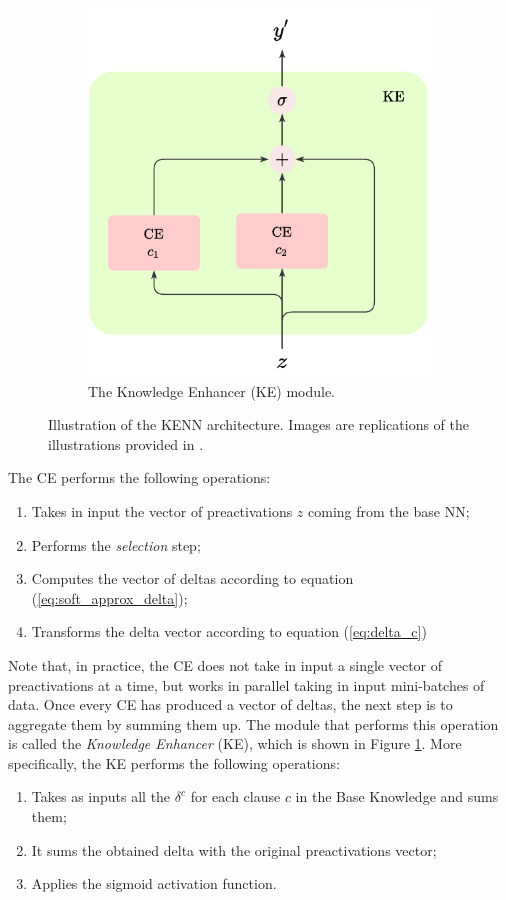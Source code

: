 \begin{figure}
\begin{subfigure}{.5\textwidth}
	\end{subfigure}%
	\begin{subfigure}{.5\textwidth}
		\centering
		\includegraphics[width=0.9\linewidth]{figures/KE.pdf}
		\caption{The Knowledge Enhancer (KE) module.}
		\label{fig:ke}	
	\end{subfigure}
	\caption{Illustration of the KENN architecture. Images are replications of the illustrations provided in \cite{daniele2019kenn}.}
	\label{fig:kenn_architecture_unary}
\end{figure}
The CE performs the following operations:
\begin{enumerate}
	\item Takes in input the vector of preactivations $z$ coming from the base NN;
	\item Performs the \textit{selection} step;
	\item Computes the vector of deltas according to equation (\ref{eq:soft_approx_delta});
	\item Transforms the delta vector according to equation (\ref{eq:delta_c})
\end{enumerate}
Note that, in practice, the CE does not take in input a single vector of preactivations at a time, but works in parallel taking in input mini-batches of data.
Once every CE has produced a vector of deltas, the next step is to aggregate them by summing them up. The module that performs this operation is called the \textit{Knowledge Enhancer} (KE), which is shown in Figure \ref{fig:ke}. More specifically, the KE performs the following operations:
\begin{enumerate}
	\item Takes as inputs all the $\delta^c$ for each clause $c$ in the Base Knowledge and sums them;
	\item It sums the obtained delta with the original preactivations vector;
	\item Applies the sigmoid activation function.
\end{enumerate}


